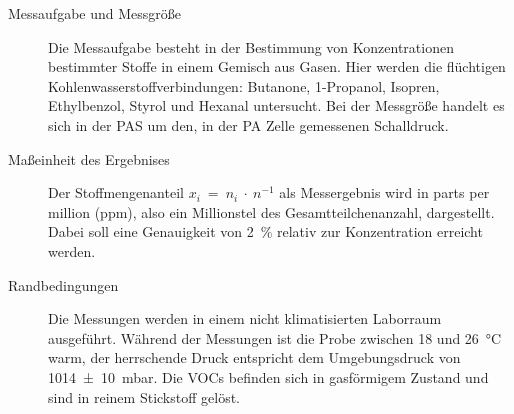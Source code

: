 \begin{description}
    \item[Messaufgabe und Messgröße] %
        Die Messaufgabe besteht in der Bestimmung von Konzentrationen bestimmter Stoffe in einem Gemisch aus Gasen.
        Hier werden die flüchtigen Kohlenwasserstoffverbindungen: Butanone, 1-Propanol, Isopren, Ethylbenzol, Styrol und Hexanal untersucht.
        Bei der Messgröße handelt es sich in der \gls{PAS} um den, in der \gls{PA} Zelle gemessenen Schalldruck.
    
    \item[Maßeinheit des Ergebnises] %
        Der Stoffmengenanteil $x_i~=~n_i~\cdot~n^{-1}$ als Messergebnis wird in parts per million (\si{ppm}), also ein Millionstel des Gesamtteilchenanzahl, dargestellt.
        Dabei soll eine Genauigkeit von \SI{2}{\percent} relativ zur Konzentration erreicht werden.
    
    \item[Randbedingungen] %
        Die Messungen werden in einem nicht klimatisierten Laborraum ausgeführt.
        Während der Messungen ist die Probe zwischen \num{18} und \SI{26}{\celsius} warm, der herrschende Druck entspricht dem Umgebungsdruck von \SI{1014+-10}{\milli\bar}.
        Die \gls{VOC}s befinden sich in gasförmigem Zustand und sind in reinem Stickstoff gelöst.


\end{description}
